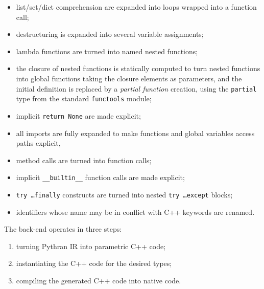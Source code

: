 \documentclass[10pt, onecolumn, preprint]{sigplanconf}
\begin{document}
\begin{itemize}
    \item list/set/dict comprehension are expanded into loops wrapped into a function call;

    \item destructuring is expanded into several variable assignments;

    \item lambda functions are turned into named nested functions;

    \item the closure of nested functions is statically computed to turn nested
        functions into global functions taking the closure elements as
        parameters, and the initial definition is replaced by a \emph{partial
        function} creation, using the \texttt{partial} type from the standard \texttt{functools} module;

    \item implicit \texttt{return None} are made explicit;

    \item all imports are fully expanded to make functions and global variables access paths explicit,

    \item method calls are turned into function calls;

    \item implicit \texttt{\_\_builtin\_\_} function calls are made explicit;

    \item \texttt{try \dots finally} constructs are turned into nested \texttt{try \dots except} blocks;

    \item identifiers whose name may be in conflict with C++ keywords are renamed.

\end{itemize}

The back-end operates in three steps:

\begin{enumerate}

    \item turning Pythran IR into parametric C++ code;

    \item instantiating the C++ code for the desired types;

    \item compiling the generated C++ code into native code.

\end{enumerate}
\end{document}
